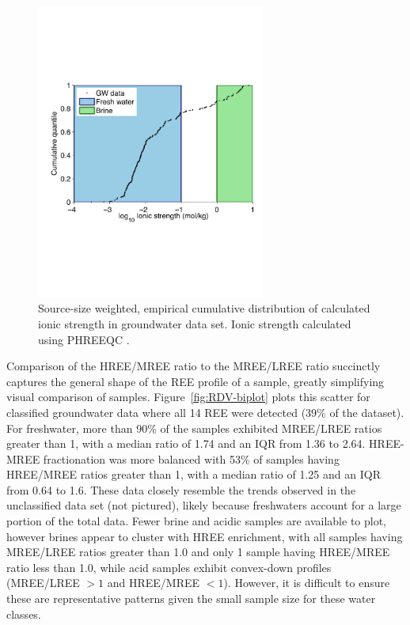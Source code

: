 \begin{figure}[htbp]
\begin{center}
\includegraphics[width=0.67\textwidth]{Ch3_figures/GW-ionic-strength.pdf}
\caption{Source-size weighted, empirical cumulative distribution of calculated ionic strength in groundwater data set. Ionic strength calculated using PHREEQC \citep{PHREEQC}.}\label{fig:I-ecdf}
\end{center}
\end{figure}

Comparison of the HREE/MREE ratio to the MREE/LREE ratio succinctly captures the general shape of the REE profile of a sample, greatly simplifying visual comparison of samples.
Figure~\ref{fig:RDV-biplot} plots this scatter for classified groundwater data where all 14 REE were detected (39\% of the dataset).
For freshwater, more than 90\% of the samples exhibited MREE/LREE ratios greater than 1, with a median ratio of 1.74 and an IQR from 1.36 to 2.64.
HREE-MREE fractionation was more balanced with 53\% of samples having HREE/MREE ratios greater than 1, with a median ratio of 1.25 and an IQR from 0.64 to 1.6.
These data closely resemble the trends observed in the unclassified data set (not pictured), likely because freshwaters account for a large portion of the total data.
Fewer brine and acidic samples are available to plot, however brines appear to cluster with HREE enrichment, with all samples having MREE/LREE ratios greater than 1.0 and only 1 sample having HREE/MREE ratio less than 1.0, while acid samples exhibit convex-down profiles (MREE/LREE $> 1$ and HREE/MREE $< 1$).
However, it is difficult to ensure these are representative patterns given the small sample size for these water classes.

